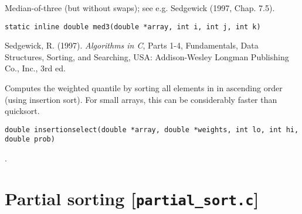 \documentclass[a4paper,oneside,10pt,DIV=12]{scrreprt}
\begin{document}
\begin{Description}
Median-of-three (but without swaps); see e.g. Sedgewick (1997, Chap. 7.5).
\end{Description}
\begin{Usage}
\begin{verbatim}
static inline double med3(double *array, int i, int j, int k)
\end{verbatim}
\end{Usage}
\begin{References}
Sedgewick, R. (1997). \textit{Algorithms in C}, Parts 1-4, Fundamentals, Data
Structures, Sorting, and Searching, USA: Addison-Wesley Longman Publishing Co.,
Inc., 3rd ed.
\end{References}

\begin{Description}
Computes the weighted quantile by sorting all elements in  in 
ascending order (using insertion sort). For small arrays, this can be 
considerably faster than quicksort. 
\end{Description}
\begin{Usage}
\begin{verbatim}
double insertionselect(double *array, double *weights, int lo, int hi, double prob)
\end{verbatim}
\end{Usage}
\begin{Dependency}
	.
\end{Dependency}

\chapter{Partial sorting [\texttt{partial\_sort.c}]}
\end{document}
